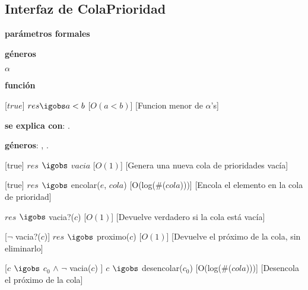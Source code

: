 \begin{Interfaz}
\subsection{Interfaz de ColaPrioridad}

  \textbf{par\'ametros formales}\parindent\\
  \parbox{1.7cm}{\textbf{g\'eneros}} $\alpha$\\
  \parbox[t]{1.7cm}{\textbf{funci\'on}}\parbox[t]{\textwidth-2\parindent-1.7cm}{%
    [$true$]
    {$res \igobs a < b$}
    [$O(a < b)$]
    [Funcion menor de $\alpha$'s]
  }

\textbf{se explica con}: .

\textbf{g\'eneros}: , .



%
[true]   %
{$res$ $\igobs$ $vacia$} %
[$O(1)$]   %
[Genera una nueva cola de prioridades vac\'ia]  %

%
[true]   %
{$res$ $\igobs$ encolar($e$, $cola$)} %
[O(log($\#$($cola$)))]   %
[Encola el elemento en la cola de prioridad]  %

{$res$ $\igobs$ vacia?($c$)}
[$O(1)$]
[Devuelve verdadero si la cola est\'a vac\'ia]

[$\neg$ vacia?($c$)]  
{$res$ $\igobs$ proximo($c$)}  %
[$O(1)$]
[Devuelve el pr\'oximo de la cola, sin eliminarlo]

[$c$ $\igobs$ $c_0$ $\land$ $\neg$ vacia($c$) ]  
{$c$ $\igobs$ desencolar($c_0$)} 
[O(log($\#$($cola$)))]   %
[Desencola el pr\'oximo de la cola]







\begin{tad}{}



\end{tad}

\end{Interfaz}